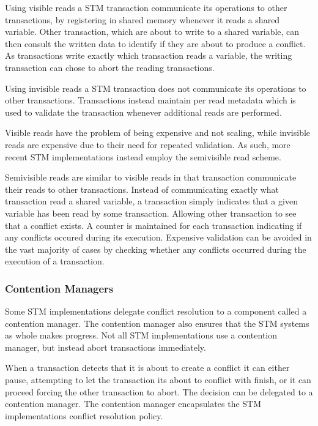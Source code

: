 Using visible reads a \ac{STM} transaction communicate its operations to other transactions, by registering in shared memory whenever it reads a shared variable\cite[p. 2]{lev2009anatomy}\cite[p. 2085]{herlihy2011tm}. Other transaction, which are about to write to a shared variable, can then consult the written data to identify if they are about to produce a conflict. As transactions write exactly which transaction reads a variable, the writing transaction can chose to abort the reading transactions\cite[p. 2]{lev2009anatomy}.

Using invisible reads a \ac{STM} transaction does not communicate its operations to other transactions\cite[p. 114]{imbs2012virtual}. Transactions instead maintain per read metadata which is used to validate the transaction whenever additional reads are performed\cite[p. 2085]{herlihy2011tm}.

Visible reads have the problem of being expensive and not scaling, while invisible reads are expensive due to their need for repeated validation. As such, more recent \ac{STM} implementations instead employ the semivisible read scheme\cite[p. 2085]{herlihy2011tm}.

Semivisible reads are similar to visible reads in that transaction communicate their reads to other transactions. Instead of communicating exactly what transaction read a shared variable, a transaction simply indicates that a given variable has been read by some transaction. Allowing other transaction to see that a conflict exists. A counter is maintained for each transaction indicating if any conflicts occured during its execution. Expensive validation can be avoided in the vast majority of cases by checking whether any conflicts occurred during the execution of a transaction\cite[p. 2]{lev2009anatomy}.

\subsubsection{Contention Managers}
Some \ac{STM} implementations delegate conflict resolution to a component called a contention manager\cite[p. 2085]{herlihy2011tm}. The contention manager also ensures that the \ac{STM} systems as whole makes progress\cite[p. 1]{guerraoui2005toward}. Not all \ac{STM} implementations use a contention manager, but instead abort transactions immediately\cite[38]{riegel2013software}.

When a transaction detects that it is about to create a conflict it can either pause, attempting to let the transaction its about to conflict with finish, or it can proceed forcing the other transaction to abort. The decision can be delegated to a contention manager. The contention manager encapsulates the \ac{STM} implementations conflict resolution policy\cite[p. 2085]{herlihy2011tm}.

